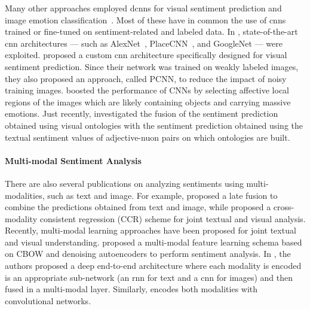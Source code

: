 Many other approaches employed \glspl{dcnn} for visual sentiment prediction and image emotion classification~\cite{campos2017pixels,chen2014deepsentibank,islam2016visual,rao2016learning,you2015robust,xu2014visual}.
Most of these have in common the use of \glspl{cnn} trained or fine-tuned on sentiment-related and labeled data.
In \cite{campos2017pixels,chen2014deepsentibank,islam2016visual,jou2015visual}, %
state-of-the-art \gls{cnn} architectures --- such as AlexNet~\cite{krizhevsky2012imagenet}, PlaceCNN~\cite{zhou2014learning}, and GoogleNet \cite{szegedy2015going} --- were exploited.
\citet{you2015robust} proposed a custom \gls{cnn} architecture specifically designed for visual sentiment prediction.
Since their network was trained on weakly labeled images, they also proposed an approach, called PCNN, to reduce the impact of noisy training images. %
\citet{sun2016discovering} boosted the performance of CNNs by selecting affective local regions of the images which are likely containing objects and carrying massive emotions. %
Just recently, \citet{li2018image} investigated the fusion of the sentiment prediction obtained using visual ontologies with the sentiment prediction obtained using the textual sentiment values of adjective-nuon pairs on which ontologies are built.


\paragraph{Multi-modal Sentiment Analysis}
There are also several publications on analyzing sentiments using multi-modalities, such as text and image.
For example, \citet{cao2016cross} proposed a late fusion to combine the predictions obtained from text and image, while \citet{you2016cross} proposed a cross-modality consistent regression (CCR) scheme for joint textual and visual analysis.
Recently, multi-modal learning approaches have been proposed for joint textual and visual understanding.
\citet{baecchi2016multimodal} proposed a multi-modal feature learning schema based on CBOW and denoising autoencoders to perform sentiment analysis.
In \cite{mao2014deep}, the authors proposed a deep end-to-end architecture where each modality is encoded is an appropriate sub-network (an \gls{rnn} for text and a \gls{cnn} for images) and then fused in a multi-modal layer.
Similarly, \citet{ma2015multimodal} encodes both modalities with convolutional networks.

